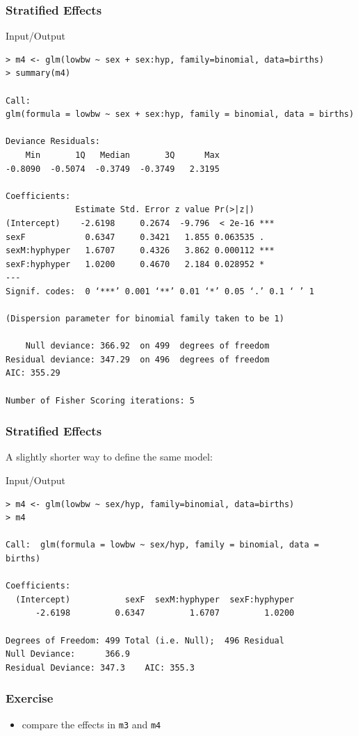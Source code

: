 \begin{frame}[fragile]\frametitle{Stratified Effects}
  \begin{exampleblock}{Input/Output}\footnotesize
\begin{verbatim}
> m4 <- glm(lowbw ~ sex + sex:hyp, family=binomial, data=births)
> summary(m4)

Call:
glm(formula = lowbw ~ sex + sex:hyp, family = binomial, data = births)

Deviance Residuals: 
    Min       1Q   Median       3Q      Max  
-0.8090  -0.5074  -0.3749  -0.3749   2.3195  

Coefficients:
              Estimate Std. Error z value Pr(>|z|)    
(Intercept)    -2.6198     0.2674  -9.796  < 2e-16 ***
sexF            0.6347     0.3421   1.855 0.063535 .  
sexM:hyphyper   1.6707     0.4326   3.862 0.000112 ***
sexF:hyphyper   1.0200     0.4670   2.184 0.028952 *  
---
Signif. codes:  0 ‘***’ 0.001 ‘**’ 0.01 ‘*’ 0.05 ‘.’ 0.1 ‘ ’ 1

(Dispersion parameter for binomial family taken to be 1)

    Null deviance: 366.92  on 499  degrees of freedom
Residual deviance: 347.29  on 496  degrees of freedom
AIC: 355.29

Number of Fisher Scoring iterations: 5
\end{verbatim}
  \end{exampleblock}
\end{frame}


\begin{frame}[fragile]\frametitle{Stratified Effects}
A slightly shorter way to define the same model:
  \begin{exampleblock}{Input/Output}\footnotesize
\begin{verbatim}
> m4 <- glm(lowbw ~ sex/hyp, family=binomial, data=births)
> m4

Call:  glm(formula = lowbw ~ sex/hyp, family = binomial, data = births)

Coefficients:
  (Intercept)           sexF  sexM:hyphyper  sexF:hyphyper  
      -2.6198         0.6347         1.6707         1.0200  

Degrees of Freedom: 499 Total (i.e. Null);  496 Residual
Null Deviance:	    366.9 
Residual Deviance: 347.3 	AIC: 355.3
\end{verbatim}
  \end{exampleblock}
\end{frame}


\begin{frame}[fragile]\frametitle{Exercise}
\begin{itemize}
\item compare the effects in \texttt{m3} and \texttt{m4}
\end{itemize}
\end{frame}

